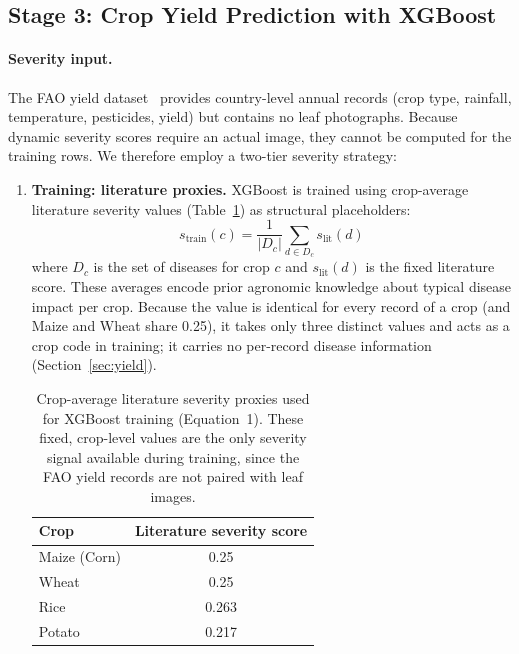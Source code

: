 \subsection{Stage 3: Crop Yield Prediction with XGBoost}
\label{sec:stage3}

\paragraph{Severity input.}
The FAO yield dataset~\cite{kaggle_yield} provides country-level annual records
(crop type, rainfall, temperature, pesticides, yield) but contains no leaf
photographs. Because dynamic severity scores require an actual image, they
cannot be computed for the training rows. We therefore employ a two-tier
severity strategy:

\begin{enumerate}
    \item \textbf{Training: literature proxies.}
    XGBoost is trained using crop-average literature severity values
    (Table~\ref{tab:literature-severity}) as structural placeholders:
    \begin{equation}
    s_{\text{train}}(c) = \frac{1}{|D_c|}\sum_{d \in D_c} s_{\text{lit}}(d)
    \end{equation}
    where $D_c$ is the set of diseases for crop $c$ and $s_{\text{lit}}(d)$
    is the fixed literature score. These averages encode prior agronomic
    knowledge about typical disease impact per crop. Because the value
    is identical for every record of a crop (and Maize and Wheat share
    0.25), it takes only three distinct values and acts as a crop code
    in training; it carries no per-record disease information
    (Section~\ref{sec:yield}).

\begin{table}[!htbp]
\centering
\caption{Crop-average literature severity proxies used for XGBoost
  training (Equation~1). These fixed, crop-level values are the only
  severity signal available during training, since the FAO yield
  records are not paired with leaf images.}
\label{tab:literature-severity}
\begin{tabular}{lc}
\toprule
\textbf{Crop} & \textbf{Literature severity score} \\
\midrule
Maize (Corn) & 0.25 \\
Wheat        & 0.25 \\
Rice         & 0.263 \\
Potato       & 0.217 \\
\bottomrule
\end{tabular}
\end{table}


\end{enumerate}
